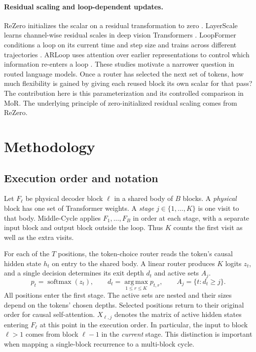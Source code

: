 \documentclass[11pt,letterpaper]{article}
\begin{document}
\paragraph{Residual scaling and loop-dependent updates.}
ReZero initializes the scalar on a residual transformation to zero \citep{rezero}. LayerScale learns channel-wise residual scales in deep vision Transformers \citep{layerscale}. LoopFormer conditions a loop on its current time and step size and trains across different trajectories \citep{loopformer}. ARLoop uses attention over earlier representations to control which information re-enters a loop \citep{arloop}. These studies motivate a narrower question in routed language models. Once a router has selected the next set of tokens, how much flexibility is gained by giving each reused block its own scalar for that pass? The contribution here is this parameterization and its controlled comparison in MoR. The underlying principle of zero-initialized residual scaling comes from ReZero.

\section{Methodology}
\subsection{Execution order and notation}
Let \(F_\ell\) be physical decoder block \(\ell\) in a shared body of \(B\) blocks. A \emph{physical} block has one set of Transformer weights. A \emph{stage} \(j\in\{1,\ldots,K\}\) is one visit to that body. Middle-Cycle applies \(F_1,\ldots,F_B\) in order at each stage, with a separate input block and output block outside the loop. Thus \(K\) counts the first visit as well as the extra visits.

For each of the \(T\) positions, the token-choice router reads the token's causal hidden state \(h_t\) on entry to the shared body. A linear router produces \(K\) logits \(z_t\), and a single decision determines its exit depth \(d_t\) and active sets \(A_j\).
\begin{equation}
  p_t=\operatorname{softmax}(z_t),\qquad
  d_t=\operatorname*{arg\,max}_{1\le r\le K}p_{t,r},\qquad
  A_j=\{t:d_t\ge j\}.
  \label{eq:routing}
\end{equation}
All positions enter the first stage. The active sets are nested and their sizes depend on the tokens' chosen depths.
Selected positions return to their original order for causal self-attention. \(X_{\ell,j}\) denotes the matrix of active hidden states entering \(F_\ell\) at this point in the execution order. In particular, the input to block \(\ell>1\) comes from block \(\ell-1\) in the \emph{current} stage. This distinction is important when mapping a single-block recurrence to a multi-block cycle.
\end{document}

